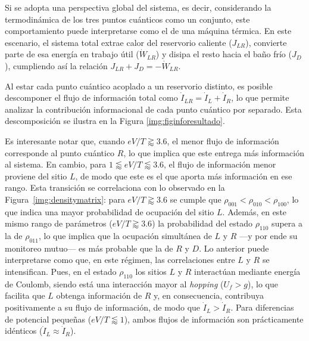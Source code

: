 Si se adopta una perspectiva global del sistema, es decir, considerando la termodinámica de los tres puntos cuánticos como un conjunto, este comportamiento puede interpretarse como el de una máquina térmica. En este escenario, el sistema total extrae calor del reservorio caliente (\( J_{LR} \)), convierte parte de esa energía en trabajo útil (\( \dot{W}_{LR} \)) y disipa el resto hacia el baño frío (\( J_D \)), cumpliendo así la relación \( J_{LR} + J_D = -\dot{W}_{LR} \).

Al estar cada punto cuántico acoplado a un reservorio distinto, es posible descomponer el flujo de información total como $\dot{I}_{LR} = \dot{I}_{L} + \dot{I}_{R}$, lo que permite analizar la contribución informacional de cada punto cuántico por separado. Esta descomposición se ilustra en la Figura \ref{img:figinforesultado}.



Es interesante notar que, cuando \( eV/T \gtrapprox 3.6 \), el menor flujo de información corresponde al punto cuántico \( R \), lo que implica que este entrega más información al sistema. En cambio, para \( 1 \lessapprox eV/T \lessapprox 3.6 \), el flujo de información menor proviene del sitio \( L \), de modo que este es el que aporta más información en ese rango. Esta transición se correlaciona con lo observado en la Figura~\ref{img:densitymatrix}: para \( eV/T \gtrapprox 3.6 \) se cumple que \(\rho_{001} < \rho_{010} < \rho_{100}\), lo que indica una mayor probabilidad de ocupación del sitio \( L \). Además, en este mismo rango de parámetros  ($eV/T \gtrapprox 3.6$) la probabilidad del estado \( \rho_{110} \) supera a la de \( \rho_{011} \), lo que implica que la ocupación simultánea de \( L \) y \( R \) ---y por ende su monitoreo mutuo--- es más probable que la de \( R \) y \( D \). Lo anterior puede interpretarse como que, en este régimen, las correlaciones entre \( L \) y \( R \) se intensifican. Pues, en el estado \( \rho_{110} \) los sitios \( L \) y \( R \) interactúan mediante energía de Coulomb, siendo está una interacción mayor al \textit{hopping} ($U_{f}>g$), lo que facilita que \( L \) obtenga información de \( R \) y, en consecuencia, contribuya positivamente a su flujo de información, de modo que \( \dot{I}_{L} > \dot{I}_{R} \). Para diferencias de potencial pequeñas (\( eV/T \lessapprox 1 \)), ambos flujos de información son prácticamente idénticos (\( \dot{I}_{L} \approx \dot{I}_{R} \)).

